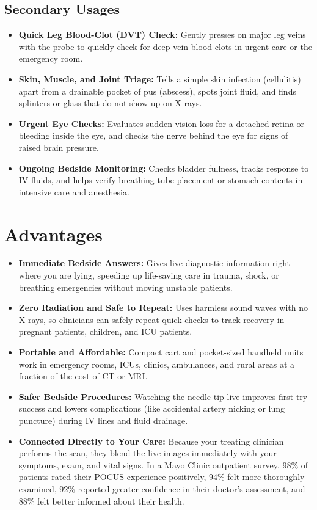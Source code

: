 \subsection{Secondary Usages}

\begin{itemize}
    \item \textbf{Quick Leg Blood-Clot (DVT) Check:} Gently presses on major leg veins with the probe to quickly check for deep vein blood clots in urgent care or the emergency room.
    \item \textbf{Skin, Muscle, and Joint Triage:} Tells a simple skin infection (cellulitis) apart from a drainable pocket of pus (abscess), spots joint fluid, and finds splinters or glass that do not show up on X-rays.
    \item \textbf{Urgent Eye Checks:} Evaluates sudden vision loss for a detached retina or bleeding inside the eye, and checks the nerve behind the eye for signs of raised brain pressure.
    \item \textbf{Ongoing Bedside Monitoring:} Checks bladder fullness, tracks response to IV fluids, and helps verify breathing-tube placement or stomach contents in intensive care and anesthesia.
\end{itemize}

\section{Advantages}

\begin{itemize}
    \item \textbf{Immediate Bedside Answers:} Gives live diagnostic information right where you are lying, speeding up life-saving care in trauma, shock, or breathing emergencies without moving unstable patients.
    \item \textbf{Zero Radiation and Safe to Repeat:} Uses harmless sound waves with no X-rays, so clinicians can safely repeat quick checks to track recovery in pregnant patients, children, and ICU patients.
    \item \textbf{Portable and Affordable:} Compact cart and pocket-sized handheld units work in emergency rooms, ICUs, clinics, ambulances, and rural areas at a fraction of the cost of CT or MRI.
    \item \textbf{Safer Bedside Procedures:} Watching the needle tip live improves first-try success and lowers complications (like accidental artery nicking or lung puncture) during IV lines and fluid drainage.
    \item \textbf{Connected Directly to Your Care:} Because your treating clinician performs the scan, they blend the live images immediately with your symptoms, exam, and vital signs. In a Mayo Clinic outpatient survey, 98\% of patients rated their POCUS experience positively, 94\% felt more thoroughly examined, 92\% reported greater confidence in their doctor's assessment, and 88\% felt better informed about their health.
\end{itemize}

